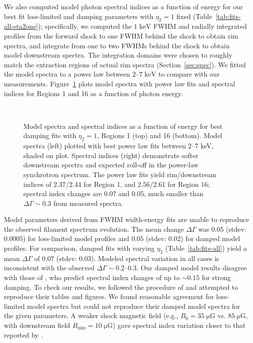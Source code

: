 \documentclass[iop, apj, numberedappendix]{emulateapj}
\newcommand*{\mt}{\mathrm}
\newcommand*{\unit}[1]{\;\mt{#1}}  %
\newcommand*{\muG}{\unit{\mu G}}
\begin{document}
We also computed model photon spectral indices as a function of energy for our
best fit loss-limited and damping parameters with $\eta_2 = 1$ fixed
(Table~\ref{tab:fits-all-eta2one}); specifically, we computed the $1
\unit{keV}$ FWHM and radially integrated profiles from the forward shock to one
FWHM behind the shock to obtain rim spectra, and integrate from one to two
FWHMs behind the shock to obtain model downstream spectra.  The integration
domains were chosen to roughly match the extraction regions of actual rim
spectra (Section~\ref{sec:spec}).  We fitted the model spectra to a power law
between $2$--$7 \unit{keV}$ to compare with our measurements.
Figure~\ref{fig:specvar} plots model spectra with power law fits and spectral
indices for Regions 1 and 16 as a function of photon energy.

\begin{figure}[h]
    \centering
     \\
    \caption{Model spectra and spectral indices as a function of energy for
    best damping fits with $\eta_2 = 1$, Regions 1 (top) and 16 (bottom).
    Model spectra (left) plotted with best power law fits between 2--7 keV,
    shaded on plot.  Spectral indices (right) demonstrate softer downstream
    spectra and expected roll-off in the power-law synchrotron spectrum.
    The power law fits yield rim/downstream indices of 2.37/2.44 for Region 1,
    and 2.56/2.61 for Region 16; spectral index changes are 0.07 and 0.05, much
    smaller than $\Delta\Gamma \sim 0.3$ from measured spectra.
    \label{fig:specvar}}
\end{figure}

Model parameters derived from FWHM width-energy fits are unable to reproduce
the observed filament spectrum evolution.  The mean change $\Delta\Gamma$ was
$0.05$ (stdev: $0.0005$) for loss-limited model profiles and $0.05$ (stdev:
$0.02$) for damped model profiles.  For comparison, damped fits with varying
$\eta_2$ (Table~\ref{tab:fits-all}) yield a mean $\Delta\Gamma$ of $0.07$
(stdev: $0.03$).  Modeled spectral variation in all cases is inconsistent with
the observed $\Delta\Gamma \sim 0.2$--$0.3$.
Our damped model results disagree with those of \citet[][Fig.~4]{rettig2012},
who predict spectral index changes of up to $\sim 0.15$ for strong damping.  To
check our results, we followed the procedure of \citet{rettig2012} and
attempted to reproduce their tables and figures.  We found reasonable agreement
for loss-limited model spectra but could not reproduce their damped model
spectra for the given parameters.  A weaker shock magnetic field (e.g., $B_0 =
35 \muG$ vs. $85 \muG$, with downstream field $B_{\mt{min}} = 10 \muG$) gave
spectral index variation closer to that reported by \citet{rettig2012}.
\end{document}
